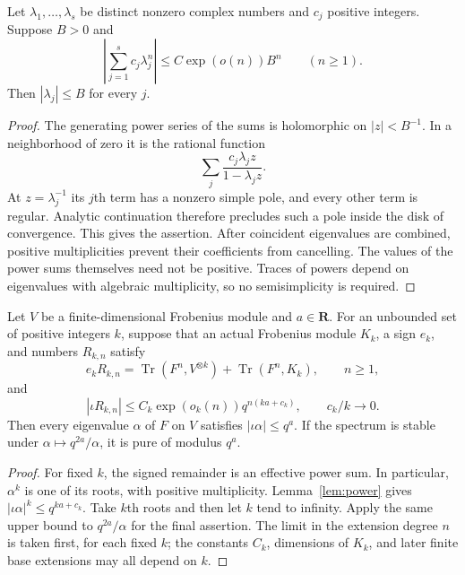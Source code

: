 \begin{lemma}
\label{lem:power}
Let $\lambda_1,\ldots,\lambda_s$ be distinct nonzero complex numbers and
$c_j$ positive integers.  Suppose $B>0$ and
\[
 \left|\sum_{j=1}^s c_j\lambda_j^n\right|
 \le C\exp(o(n)) B^n \qquad(n\ge1).
\]
Then $|\lambda_j|\le B$ for every $j$.
\end{lemma}
\begin{proof}
The generating power series of the sums is holomorphic on $|z|<B^{-1}$.
In a neighborhood of zero it is the rational function
\[
 \sum_j \frac{c_j\lambda_j z}{1-\lambda_j z}.
\]
At $z=\lambda_j^{-1}$ its $j$th term has a nonzero simple pole, and every
other term is regular.  Analytic continuation therefore precludes such a
pole inside the disk of convergence.  This gives the assertion.  After
coincident eigenvalues are combined, positive multiplicities prevent their
coefficients from cancelling.  The values of the power sums themselves
need not be positive.  Traces of powers depend on eigenvalues with algebraic
multiplicity, so no semisimplicity is required.
\end{proof}

\begin{theorem}
\label{thm:tensor}
Let $V$ be a finite-dimensional Frobenius module and $a\in\mathbf R$.
For an unbounded set of positive integers $k$, suppose that an actual
Frobenius module $K_k$, a sign $e_k$, and numbers $R_{k,n}$ satisfy
\[
 e_kR_{k,n}=\operatorname{Tr}(F^n,V^{\otimes k})
                  +\operatorname{Tr}(F^n,K_k),\qquad n\ge1,
\]
and
\[
 |\iota R_{k,n}|\le C_k\exp(o_k(n))q^{n(ka+c_k)},
 \qquad c_k/k\longrightarrow0.
\]
Then every eigenvalue $\alpha$ of $F$ on $V$ satisfies
$|\iota\alpha|\le q^a$.
If the spectrum is stable under $\alpha\mapsto q^{2a}/\alpha$, it is pure
of modulus $q^a$.
\end{theorem}
\begin{proof}
For fixed $k$, the signed remainder is an effective power sum.  In
particular, $\alpha^k$ is one of its roots, with positive multiplicity.
Lemma~\ref{lem:power} gives
$|\iota\alpha|^k\le q^{ka+c_k}$.  Take $k$th roots and then let $k$ tend
to infinity.  Apply the same upper bound to $q^{2a}/\alpha$ for the final
assertion.  The limit in the extension degree $n$ is taken first, for each
fixed $k$; the constants $C_k$, dimensions of $K_k$, and later finite base
extensions may all depend on $k$.
\end{proof}

